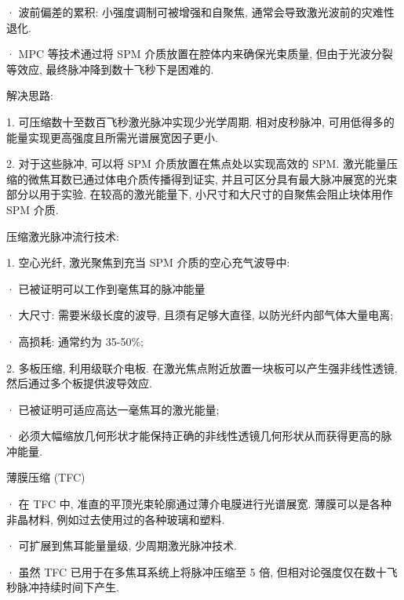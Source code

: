 \documentclass[14pt,a4paper,oneside]{article}
\begin{document}
· 波前偏差的累积: 小强度调制可被增强和自聚焦, 通常会导致激光波前的灾难性退化\cite{makNdglassLasers1990}. 

· MPC 等技术通过将 SPM 介质放置在腔体内来确保光束质量, 但由于光波分裂等效应, 最终脉冲降到数十飞秒下是困难的. \cite{ueffingNonlinearPulseCompression2018}

解决思路:

1. 可压缩数十至数百飞秒激光脉冲实现少光学周期. 相对皮秒脉冲, 可用低得多的能量实现更高强度且所需光谱展宽因子更小. 

2. 对于这些脉冲, 可以将 SPM 介质放置在焦点处以实现高效的 SPM. 激光能量压缩的微焦耳数已通过体电介质传播得到证实, 并且可区分具有最大脉冲展宽的光束部分以用于实验\cite{mevelExtracavityCompressionTechnique2003, hemmerSelfcompressionSub3cycleDuration2013, seidelAllSolidstateSpectral2016}. 在较高的激光能量下, 小尺寸和大尺寸的自聚焦会阻止块体用作 SPM 介质. 

压缩激光脉冲流行技术:

1. 空心光纤, 激光聚焦到充当 SPM 介质的空心充气波导中:

· 已被证明可以工作到毫焦耳的脉冲能量\cite{nagyGenerationThreecycleMultimillijoule2019, nagyGenerationAboveterawatt5cycle2020}

· 大尺寸: 需要米级长度的波导, 且须有足够大直径, 以防光纤内部气体大量电离;

· 高损耗: 通常约为 35-50\%;

2. 多板压缩, 利用级联介电板. 在激光焦点附近放置一块板可以产生强非线性透镜, 然后通过多个板提供波导效应\cite{luGenerationIntenseSupercontinuum2014, luSub4FsLaser2018}.

· 已被证明可适应高达一毫焦耳的激光能量\cite{heHighefficiencySupercontinuumGeneration2017};

· 必须大幅缩放几何形状才能保持正确的非线性透镜几何形状从而获得更高的脉冲能量.

薄膜压缩 (TFC) 

· 在 TFC 中, 准直的平顶光束轮廓通过薄介电膜进行光谱展宽. 薄膜可以是各种非晶材料, 例如过去使用过的各种玻璃和塑料\cite{masruriOpticalThinFilm2019, mironovThinPlateCompression2020, khazanovNonlinearCompressionHighpower2019, farinellaFocusabilityLaserPulses2019, mironov100JlevelPulse2017, ginzburgInfluenceCubicSpectral2016, mironovSpatiallyuniformTemporalRecompression2014}. 

· 可扩展到焦耳能量量级, 少周期激光脉冲技术\cite{mourouSingleCycleThin2014, mourouDeviceGeneratingShort2014}. 

· 虽然 TFC 已用于在多焦耳系统上将脉冲压缩至 5 倍\cite{ginzburgCompressionCompressorThreefold2019, ginzburgFivefoldCompression250TW2020}, 但相对论强度仅在数十飞秒脉冲持续时间下产生\cite{farinellaFocusabilityLaserPulses2019, farinellaDemonstrationThinFilm2019}. 
\end{document}
